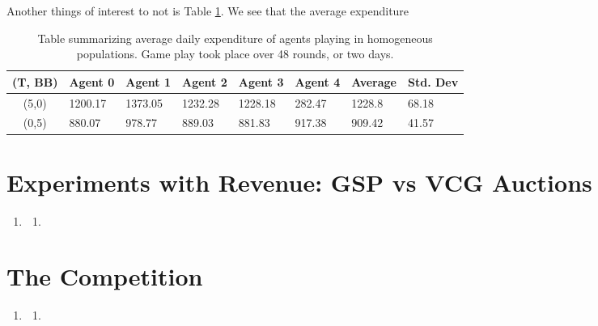 \documentclass[11pt]{article}
\begin{document}
\begin{enumerate}
\begin{enumerate}
    Another things of interest to not is Table \ref{tab:bb_tt_spend}. We see that the average expenditure 
    \begin{table}[h]
      \centering
      \begin{tabular}{clllllll}
      \hline
      (T, BB) & Agent 0           & Agent 1           & Agent 2           & Agent 3           & Agent 4          & Average          & Std. Dev     \\ \hline
      (5,0)   & 1200.17 & 1373.05 & 1232.28 & 1228.18 & 282.47 & 1228.8   & 68.18   \\
      (0,5)   & 880.07   &  978.77  &  889.03  &  881.83  &  917.38 &  909.42 & 41.57 \\ \hline
      \end{tabular}
      \caption{Table summarizing average daily expenditure of agents playing in homogeneous populations. Game play took place over 48 rounds, or two days.}
      \label{tab:bb_tt_spend}
      \end{table}
  \end{enumerate}
\end{enumerate}

\section*{Experiments with Revenue: GSP vs VCG Auctions}
\begin{enumerate}[resume]
\item 
  \begin{enumerate}
  \item
  \end{enumerate}
\end{enumerate}

\section*{The Competition}
\begin{enumerate}[resume]
\item
  \begin{enumerate}
  \item 
  \end{enumerate}
\end{enumerate}
\end{document}

